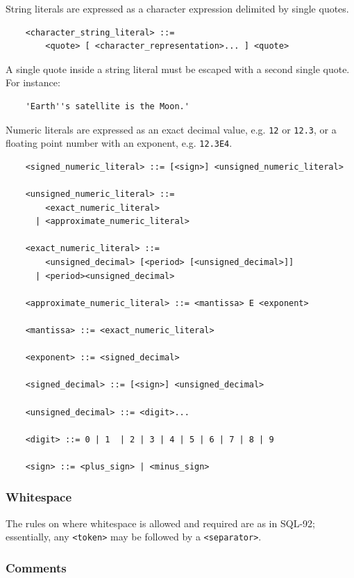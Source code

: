 \documentclass[11pt,a4paper]{ivoa}
\begin{document}
String literals are expressed as a character expression delimited by single
quotes.

\begin{verbatim}
    <character_string_literal> ::=
        <quote> [ <character_representation>... ] <quote>
\end{verbatim}

A single quote inside a string literal must be escaped with a second single
quote. For instance:

\begin{verbatim}
    'Earth''s satellite is the Moon.'
\end{verbatim}

Numeric literals are expressed as an exact decimal value, e.g. \verb:12: or
\verb:12.3:, or a floating point number with an exponent, e.g. \verb:12.3E4:.

\begin{verbatim}
    <signed_numeric_literal> ::= [<sign>] <unsigned_numeric_literal>

    <unsigned_numeric_literal> ::=
        <exact_numeric_literal>
      | <approximate_numeric_literal>

    <exact_numeric_literal> ::=
        <unsigned_decimal> [<period> [<unsigned_decimal>]]
      | <period><unsigned_decimal>

    <approximate_numeric_literal> ::= <mantissa> E <exponent>

    <mantissa> ::= <exact_numeric_literal>

    <exponent> ::= <signed_decimal>

    <signed_decimal> ::= [<sign>] <unsigned_decimal>

    <unsigned_decimal> ::= <digit>...

    <digit> ::= 0 | 1  | 2 | 3 | 4 | 5 | 6 | 7 | 8 | 9

    <sign> ::= <plus_sign> | <minus_sign>
\end{verbatim}

\subsubsection{Whitespace}
\label{sec:whitespace}

The rules on where whitespace is allowed and required are as in SQL-92;
essentially, any \verb:<token>: may be followed by a \verb:<separator>:.

\subsubsection{Comments}
\label{sec:comments}
\end{document}
